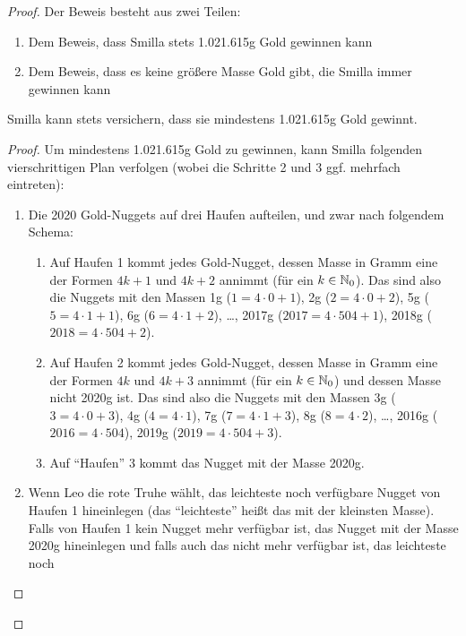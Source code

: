 \begin{proof}
    Der Beweis besteht aus zwei Teilen:
    \begin{enumerate}
        \item Dem Beweis, dass Smilla stets 1.021.615g Gold gewinnen kann
        \item Dem Beweis, dass es keine größere Masse Gold gibt, die Smilla immer gewinnen kann
    \end{enumerate}
    \renewcommand{\qedsymbol}{$\square$}
    \begin{lem}\label{smilla}
        Smilla kann stets versichern, dass sie mindestens 1.021.615g Gold gewinnt.
    \end{lem}
    \begin{proof}
        Um mindestens 1.021.615g Gold zu gewinnen, kann Smilla folgenden vierschrittigen Plan verfolgen (wobei die 
        Schritte 2 und 3 ggf. mehrfach eintreten):
        \begin{enumerate}
            \item Die 2020 Gold-Nuggets auf drei Haufen aufteilen, und zwar nach folgendem Schema:
            \begin{enumerate}
                \item Auf Haufen 1 kommt jedes Gold-Nugget, dessen Masse in Gramm eine der Formen $4k+1$ und $4k+2$ 
                annimmt (für ein $k \in \mathbb{N}_0$). Das sind also die Nuggets mit den Massen 1g ($1 = 4 \cdot 0+1$), 2g 
                ($2 = 4\cdot 0+2$), 5g ($5 = 4 \cdot 1+1$), 6g ($6=4\cdot 1+2$), \dots, 2017g ($2017=4\cdot 504+1$), 
                2018g ($2018=4\cdot 504+2$).
                \item Auf Haufen 2 kommt jedes Gold-Nugget, dessen Masse in Gramm eine der Formen $4k$ und $4k+3$ 
                annimmt (für ein $k \in \mathbb{N}_0$) und dessen Masse nicht 2020g ist. Das sind also die Nuggets mit den 
                Massen 3g ($3=4\cdot 0+3$), 4g ($4=4\cdot 1$), 7g ($7=4\cdot 1+3$), 8g ($8=4\cdot 2$), \dots, 2016g 
                ($2016=4\cdot 504$), 2019g ($2019=4\cdot 504+3$).
                \item Auf "`Haufen"' 3 kommt das Nugget mit der Masse 2020g.
            \end{enumerate}
            \item Wenn Leo die rote Truhe wählt, das leichteste noch verfügbare Nugget von Haufen 1 hineinlegen (das 
            "`leichteste"' heißt das mit der kleinsten Masse). Falls von Haufen 1 kein Nugget mehr verfügbar ist, das 
            Nugget mit der Masse 2020g hineinlegen und falls auch das nicht mehr verfügbar ist, das leichteste noch 

\end{enumerate}
\end{proof}
\end{proof}
